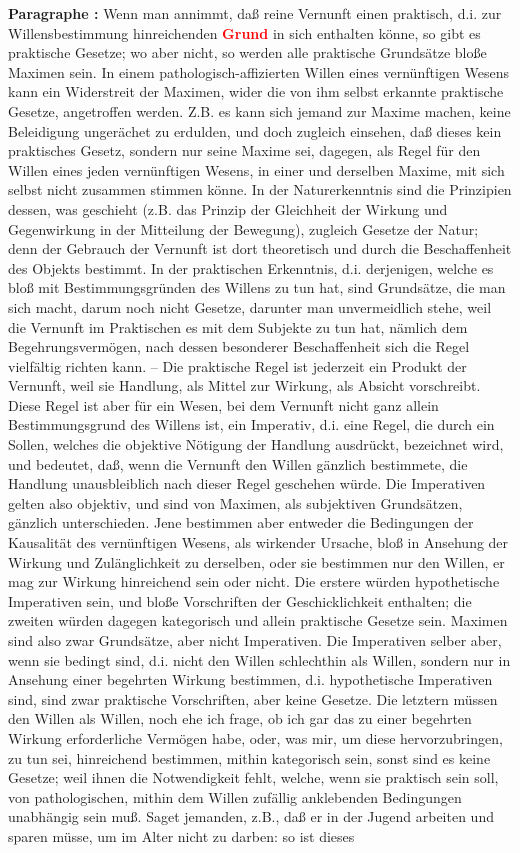 \documentclass[a4paper,12pt,twoside]{book}
\newcommand{\match}[1]{\textcolor{red}{\textbf{#1}}}
\begin{document}
	\noindent\textbf{Paragraphe : }Wenn man annimmt, daß reine Vernunft einen praktisch, d.i. zur Willensbestimmung hinreichenden \match{Grund} in sich enthalten könne, so gibt es praktische Gesetze; wo aber nicht, so werden alle praktische Grundsätze bloße Maximen sein. In einem pathologisch-affizierten Willen eines vernünftigen Wesens kann ein Widerstreit der Maximen, wider die von ihm selbst erkannte praktische Gesetze, angetroffen werden. Z.B. es kann sich jemand zur Maxime machen, keine Beleidigung ungerächet zu erdulden, und doch zugleich einsehen, daß dieses kein praktisches Gesetz, sondern nur seine Maxime sei, dagegen, als Regel für den Willen eines jeden vernünftigen Wesens, in einer und derselben Maxime, mit sich selbst nicht zusammen stimmen könne. In der Naturerkenntnis sind die Prinzipien dessen, was geschieht (z.B. das Prinzip der Gleichheit der Wirkung und Gegenwirkung in der Mitteilung der Bewegung), zugleich Gesetze der Natur; denn der Gebrauch der Vernunft ist dort theoretisch und durch die Beschaffenheit des Objekts bestimmt. In der praktischen Erkenntnis, d.i. derjenigen, welche es bloß mit Bestimmungsgründen des Willens zu tun  hat, sind Grundsätze, die man sich macht, darum noch nicht Gesetze, darunter man unvermeidlich stehe, weil die Vernunft im Praktischen es mit dem Subjekte zu tun hat, nämlich dem Begehrungsvermögen, nach dessen besonderer Beschaffenheit sich die Regel vielfältig richten kann. – Die praktische Regel ist jederzeit ein Produkt der Vernunft, weil sie Handlung, als Mittel zur Wirkung, als Absicht vorschreibt. Diese Regel ist aber für ein Wesen, bei dem Vernunft nicht ganz allein Bestimmungsgrund des Willens ist, ein Imperativ, d.i. eine Regel, die durch ein Sollen, welches die objektive Nötigung der Handlung ausdrückt, bezeichnet wird, und bedeutet, daß, wenn die Vernunft den Willen gänzlich bestimmete, die Handlung unausbleiblich nach dieser Regel geschehen würde. Die Imperativen gelten also objektiv, und sind von Maximen, als subjektiven Grundsätzen, gänzlich unterschieden. Jene bestimmen aber entweder die Bedingungen der Kausalität des vernünftigen Wesens, als wirkender Ursache, bloß in Ansehung der Wirkung und Zulänglichkeit zu derselben, oder sie bestimmen nur den Willen, er mag zur Wirkung hinreichend sein oder nicht. Die erstere würden hypothetische Imperativen sein, und bloße Vorschriften der Geschicklichkeit enthalten; die zweiten würden dagegen kategorisch und allein praktische Gesetze sein. Maximen sind also zwar Grundsätze, aber nicht Imperativen. Die Imperativen selber aber, wenn sie bedingt sind, d.i. nicht den Willen schlechthin als Willen, sondern nur in Ansehung einer begehrten Wirkung bestimmen, d.i. hypothetische Imperativen sind, sind zwar praktische Vorschriften, aber keine Gesetze. Die letztern müssen den Willen als Willen, noch ehe ich frage, ob ich gar das zu einer begehrten Wirkung erforderliche Vermögen habe, oder, was mir, um diese hervorzubringen, zu tun sei, hinreichend bestimmen, mithin kategorisch sein, sonst sind es keine Gesetze; weil ihnen die Notwendigkeit fehlt, welche, wenn sie praktisch sein soll, von pathologischen, mithin dem Willen zufällig anklebenden Bedingungen unabhängig sein muß. Saget jemanden, z.B., daß er in der Jugend arbeiten und sparen müsse, um im Alter nicht  zu darben: so ist dieses 
\end{document}
